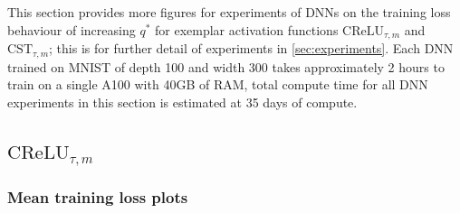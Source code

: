 \documentclass{article}
\theoremstyle{plain}
\theoremstyle{definition}
\theoremstyle{remark}
\begin{document}

This section provides more figures for experiments of DNNs on the training loss behaviour of increasing $q^*$ for exemplar activation functions $\text{CReLU}_{\tau, m}$ and $\text{CST}_{\tau, m}$; this is for further detail of experiments in \cref{sec:experiments}. Each DNN trained on MNIST of depth 100 and width 300 takes approximately 2 hours to train on a single A100 with 40GB of RAM, total compute time for all DNN experiments in this section is estimated at 35 days of compute.

\subsection{\texorpdfstring{$\text{CReLU}_{\tau, m}$}{CReLU}}
\subsubsection{Mean training loss plots}
\end{document}
